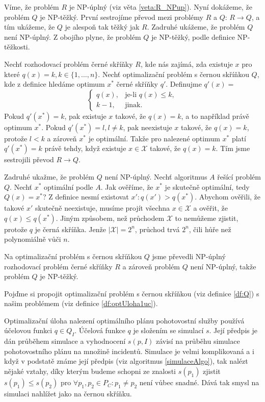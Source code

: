 \begin{dukaz}
  Víme, že problém $R$ je NP-úplný (viz věta \ref{veta:R_NPup}). Nyní dokážeme, že problém $Q$ je NP-těžký.
  První sestrojíme převod mezi problémy $R$ a $Q$: $R \rightarrow Q$, a tím ukážeme, že $Q$ je alespoň tak těžký jak $R$.
  Zadruhé ukážeme, že problém $Q$ není NP-úplný.
  Z obojího plyne, že problém $Q$ je NP-těžký, podle definice NP-těžkosti.

  Nechť rozhodovací problém černé skříňky $R$, kde nás zajímá, zda existuje $x$ pro které $q(x) = k, k \in \{ 1, \dots, n\}$. 
  Nechť optimalizační problém s černou skříňkou $Q$, kde z definice hledáme optimum $x^*$ černé skříňky $q'$.
  Definujme $q'(x) = $
  \[
  \begin{cases}
    q(x), & \text{je-li $q(x) \leq k$},\\
    k - 1, & \text{jinak}.
  \end{cases}
  \]
  Pokud $q'(x^*) = k$, pak existuje $x$ takové, že $q(x) = k$, a to například právě optimum $x^*$.
  Pokud $q'(x^*) = l, l \neq k$, pak neexistuje $x$ takové, že $q(x) = k$, protože $l < k$ a zároveň $x^*$ je optimální.
  Takže pro nalezené optimum $x^*$ platí $q'(x^*) = k$ právě tehdy, když existuje $x \in \mathcal{X}$ takové, že $q(x) = k$.
  Tím jsme sestrojili převod $R \rightarrow Q$.

  Zadruhé ukažme, že problém $Q$ není NP-úplný.
  Nechť algoritmus $A$ řešící problém $Q$.
  Nechť $x^*$ optimální podle $A$. Jak ověříme, že $x^*$ je skutečně optimální, tedy $Q(x) = x^*$?
  Z definice nesmí existovat $x' \colon q(x') > q(x^*)$.
  Abychom ověřili, že takové $x'$ skutečně neexistuje, musíme projít všechna $x \in \mathcal{X}$ a ověřit, že $q(x) \leq q(x^*)$.
  Jiným způsobem, než průchodem $\mathcal{X}$ to nemůžeme zjistit, protože $q$ je černá skříňka.
  Jenže $|\mathcal{X}| = 2^n$, průchod trvá $2^n$, čili hůře než polynomiálně vůči $n$.

  Na optimalizační problém s černou skříňkou $Q$ jsme převedli NP-úplný rozhodovací problém černé skříňky $R$ a zároveň
  problém $Q$ není NP-úplný, takže problém $Q$ je NP-těžký.
\end{dukaz}

Pojďme si propojit optimalizační problém s černou skříňkou (viz definice \ref{df:Q}) s našim problémem (viz definice \ref{df:optUloha1uc}). 

Optimalizační úloha nalezení optimálního plánu pohotovostní služby používá účelovou funkci $q \in Q_I$.
Účelová funkce $q$ je složením se simulací $s$.
Její předpis je dán průběhem simulace a vyhodnocení $s(p, I)$ závisí na průběhu simulace pohotovostního plánu na množině incidentů.
Simulace je velmi komplikovaná a i když v podstatě známe její předpis (viz algoritmus \ref{simulaceAlgo}),
tak nalézt nějaké vztahy, díky kterým budeme schopni ze znalosti $s(p_1)$ zjistit $s(p_1) \leq s(p_2)$ pro $\forall p_1, p_2 \in P_C \colon p_1 \neq p_2$ není vůbec snadné.
Dává tak smysl na simulaci nahlížet jako na černou skříňku.

